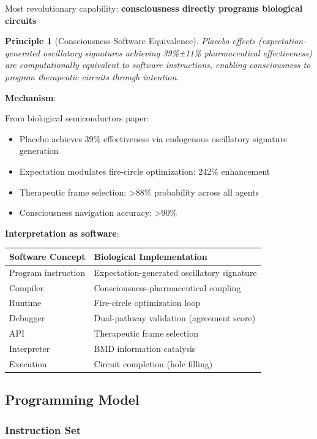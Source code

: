 \documentclass[11pt,a4paper]{article}
\newtheorem{principle}{Principle}[section]
\begin{document}
Most revolutionary capability: \textbf{consciousness directly programs biological circuits}

\begin{principle}[Consciousness-Software Equivalence]
Placebo effects (expectation-generated oscillatory signatures achieving 39\%±11\% pharmaceutical effectiveness) are computationally equivalent to software instructions, enabling consciousness to program therapeutic circuits through intention.
\end{principle}

\textbf{Mechanism}:

From biological semiconductors paper:
\begin{itemize}
\item Placebo achieves 39\% effectiveness via endogenous oscillatory signature generation
\item Expectation modulates fire-circle optimization: 242\% enhancement
\item Therapeutic frame selection: >88\% probability across all agents
\item Consciousness navigation accuracy: >90\%
\end{itemize}

\textbf{Interpretation as software}:

\begin{center}
\begin{tabular}{ll}
\toprule
\textbf{Software Concept} & \textbf{Biological Implementation} \\
\midrule
Program instruction & Expectation-generated oscillatory signature \\
Compiler & Consciousness-pharmaceutical coupling \\
Runtime & Fire-circle optimization loop \\
Debugger & Dual-pathway validation (agreement score) \\
API & Therapeutic frame selection \\
Interpreter & BMD information catalysis \\
Execution & Circuit completion (hole filling) \\
\bottomrule
\end{tabular}
\end{center}

\subsection{Programming Model}

\subsubsection{Instruction Set}
\end{document}
